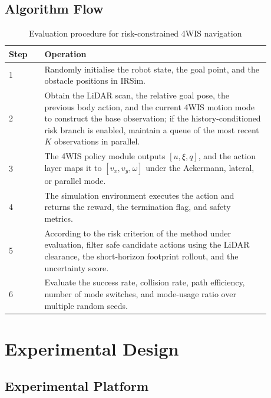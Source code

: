 \documentclass[10pt,a4paper,twocolumn]{article}
\begin{document}
\subsection{Algorithm Flow}

\begin{table}[H]
    \centering

    \caption{Evaluation procedure for risk-constrained 4WIS navigation}
    \label{tab:algorithm}
    \small
    \begin{tabular}
{p{0.12\linewidth}p{0.76\linewidth}}
        \toprule

        Step & Operation \\
        \midrule

        1 & Randomly initialise the robot state, the goal point, and the obstacle positions in IRSim. \\
        2 & Obtain the LiDAR scan, the relative goal pose, the previous body action, and the current 4WIS motion mode to construct the base observation; if the history-conditioned risk branch is enabled, maintain a queue of the most recent $K$ observations in parallel. \\
        3 & The 4WIS policy module outputs $[u,\xi,q]$, and the action layer maps it to $[v_x,v_y,\omega]$ under the Ackermann, lateral, or parallel mode. \\
        4 & The simulation environment executes the action and returns the reward, the termination flag, and safety metrics. \\
        5 & According to the risk criterion of the method under evaluation, filter safe candidate actions using the LiDAR clearance, the short-horizon footprint rollout, and the uncertainty score. \\
        6 & Evaluate the success rate, collision rate, path efficiency, number of mode switches, and mode-usage ratio over multiple random seeds. \\
        \bottomrule

    
\end{tabular}
\end{table}

\section{Experimental Design}

\subsection{Experimental Platform}
\end{document}
